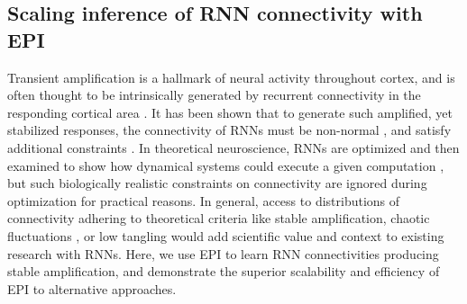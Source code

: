 \documentclass[11pt]{article}
\begin{document}
\subsection{Scaling inference of RNN connectivity with EPI} \label{results_RNN}
Transient amplification is a hallmark of neural activity throughout cortex, and is often thought to be intrinsically generated by recurrent connectivity in the responding cortical area \cite{murphy2009balanced, hennequin2014optimal, bondanelli2019population}.
It has been shown that to generate such amplified, yet stabilized responses, the connectivity of RNNs must be non-normal \cite{goldman2009memory, murphy2009balanced}, and satisfy additional constraints \cite{bondanelli2020coding}.
In theoretical neuroscience, RNNs are optimized and then examined to show how dynamical systems could execute a given computation \cite{sussillo2014neural, barak2017recurrent}, but such biologically realistic constraints on connectivity are  ignored during optimization for practical reasons.
In general, access to distributions of connectivity adhering to theoretical criteria like stable amplification, chaotic fluctuations \cite{sompolinsky1988chaos}, or low tangling \cite{russo2018motor} would add scientific value and context to existing research with RNNs.
Here, we use EPI to learn RNN connectivities producing stable amplification, and demonstrate the superior scalability and efficiency of EPI to alternative approaches.
\end{document}
